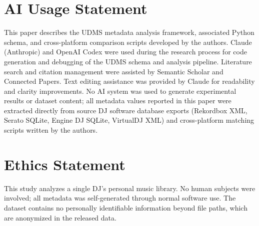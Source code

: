\documentclass[letterpaper,10pt]{article}
\begin{document}
\section{AI Usage Statement}
This paper describes the UDMS metadata analysis framework, associated Python schema, and cross-platform comparison scripts developed by the authors. Claude (Anthropic) and OpenAI Codex were used during the research process for code generation and debugging of the UDMS schema and analysis pipeline. Literature search and citation management were assisted by Semantic Scholar and Connected Papers. Text editing assistance was provided by Claude for readability and clarity improvements. No AI system was used to generate experimental results or dataset content; all metadata values reported in this paper were extracted directly from source DJ software database exports (Rekordbox XML, Serato SQLite, Engine DJ SQLite, VirtualDJ XML) and cross-platform matching scripts written by the authors.

\section{Ethics Statement}
This study analyzes a single DJ's personal music library. No human subjects were involved; all metadata was self-generated through normal software use. The dataset contains no personally identifiable information beyond file paths, which are anonymized in the released data.



\end{document}
